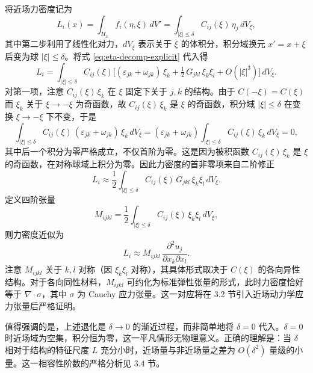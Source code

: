 将近场力密度记为
\begin{equation}
\label{eq:force-density-def}
L_i(x) = \int_{H_x} f_i(\eta,\xi)\,dV' = \int_{|\xi|\le\delta} C_{ij}(\xi)\,\eta_j\,dV_\xi,
\end{equation}
其中第二步利用了线性化对力，$dV_\xi$ 表示关于 $\xi$ 的体积分，积分域换元 $x'=x+\xi$ 后变为球 $|\xi|\le\delta$。将式 \eqref{eq:eta-decomp-explicit} 代入得
\begin{equation}
\label{eq:force-density-expand}
L_i = \int_{|\xi|\le\delta} C_{ij}(\xi)\bigl[(\varepsilon_{jk}+\omega_{jk})\,\xi_k + \tfrac{1}{2}\,G_{jkl}\,\xi_k\xi_l + O(|\xi|^3)\bigr]\,dV_\xi.
\end{equation}
对第一项，注意 $C_{ij}(\xi)\,\xi_k$ 在 $\xi$ 固定下关于 $j,k$ 的结构。由于 $C(-\xi)=C(\xi)$ 而 $\xi_k$ 关于 $\xi\to-\xi$ 为奇函数，故 $C_{ij}(\xi)\,\xi_k$ 是 $\xi$ 的奇函数，积分域 $|\xi|\le\delta$ 在变换 $\xi\to-\xi$ 下不变，于是
\begin{equation}
\label{eq:first-term-vanish}
\int_{|\xi|\le\delta} C_{ij}(\xi)\,(\varepsilon_{jk}+\omega_{jk})\,\xi_k\,dV_\xi = (\varepsilon_{jk}+\omega_{jk})\int_{|\xi|\le\delta} C_{ij}(\xi)\,\xi_k\,dV_\xi = 0,
\end{equation}
其中后一个积分为零严格成立，不仅首阶为零。这是因为被积函数 $C_{ij}(\xi)\,\xi_k$ 是 $\xi$ 的奇函数，在对称球域上积分为零。因此力密度的首非零项来自二阶修正
\begin{equation}
\label{eq:second-order-term}
L_i \approx \frac{1}{2}\int_{|\xi|\le\delta} C_{ij}(\xi)\,G_{jkl}\,\xi_k\xi_l\,dV_\xi.
\end{equation}
定义四阶张量
\begin{equation}
\label{eq:modulus-tensor-M}
M_{ijkl} = \frac{1}{2}\int_{|\xi|\le\delta} C_{ij}(\xi)\,\xi_k\xi_l\,dV_\xi,
\end{equation}
则力密度近似为
\begin{equation}
\label{eq:force-density-approx}
L_i \approx M_{ijkl}\,\frac{\partial^2 u_j}{\partial x_k\partial x_l}.
\end{equation}
注意 $M_{ijkl}$ 关于 $k,l$ 对称（因 $\xi_k\xi_l$ 对称），其具体形式取决于 $C(\xi)$ 的各向异性结构。对于各向同性材料，$M_{ijkl}$ 可约化为标准弹性张量的形式，此时力密度恰好等于 $\nabla\cdot\sigma$，其中 $\sigma$ 为 Cauchy 应力张量。这一对应将在 3.2 节引入近场动力学应力张量后严格证明。

值得强调的是，上述退化是 $\delta\to 0$ 的渐近过程，而非简单地将 $\delta=0$ 代入。$\delta=0$ 时近场域为空集，积分恒为零，这一平凡情形无物理意义。正确的理解是：当 $\delta$ 相对于结构的特征尺度 $L$ 充分小时，近场量与非近场量之差为 $O(\delta^2)$ 量级的小量。这一相容性阶数的严格分析见 3.4 节。

